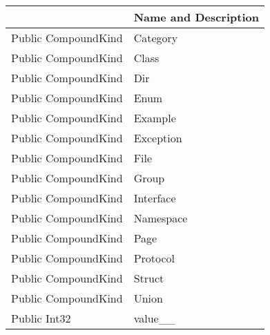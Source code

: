 \documentclass[11pt, oneside, a4paper]{book}
\begin{document}
\begin{center}
\begin{tabular}{| p{3cm} | p{12cm} | }
\hline
\textbf{ } & \textbf{ Name and Description}\\
\hline
 Public  CompoundKind &  Category\hypertarget{SoftwareEngineeringTools.{}Documentation.{}CompoundKind.{}Category}{}\\
\hline
 Public  CompoundKind &  Class\hypertarget{SoftwareEngineeringTools.{}Documentation.{}CompoundKind.{}Class}{}\\
\hline
 Public  CompoundKind &  Dir\hypertarget{SoftwareEngineeringTools.{}Documentation.{}CompoundKind.{}Dir}{}\\
\hline
 Public  CompoundKind &  Enum\hypertarget{SoftwareEngineeringTools.{}Documentation.{}CompoundKind.{}Enum}{}\\
\hline
 Public  CompoundKind &  Example\hypertarget{SoftwareEngineeringTools.{}Documentation.{}CompoundKind.{}Example}{}\\
\hline
 Public  CompoundKind &  Exception\hypertarget{SoftwareEngineeringTools.{}Documentation.{}CompoundKind.{}Exception}{}\\
\hline
 Public  CompoundKind &  File\hypertarget{SoftwareEngineeringTools.{}Documentation.{}CompoundKind.{}File}{}\\
\hline
 Public  CompoundKind &  Group\hypertarget{SoftwareEngineeringTools.{}Documentation.{}CompoundKind.{}Group}{}\\
\hline
 Public  CompoundKind &  Interface\hypertarget{SoftwareEngineeringTools.{}Documentation.{}CompoundKind.{}Interface}{}\\
\hline
 Public  CompoundKind &  Namespace\hypertarget{SoftwareEngineeringTools.{}Documentation.{}CompoundKind.{}Namespace}{}\\
\hline
 Public  CompoundKind &  Page\hypertarget{SoftwareEngineeringTools.{}Documentation.{}CompoundKind.{}Page}{}\\
\hline
 Public  CompoundKind &  Protocol\hypertarget{SoftwareEngineeringTools.{}Documentation.{}CompoundKind.{}Protocol}{}\\
\hline
 Public  CompoundKind &  Struct\hypertarget{SoftwareEngineeringTools.{}Documentation.{}CompoundKind.{}Struct}{}\\
\hline
 Public  CompoundKind &  Union\hypertarget{SoftwareEngineeringTools.{}Documentation.{}CompoundKind.{}Union}{}\\
\hline
 Public  Int32 &  value\_\_\hypertarget{SoftwareEngineeringTools.{}Documentation.{}CompoundKind.{}value\_\_}{}\\
\hline
\end{tabular}
\end{center}
\end{document}
